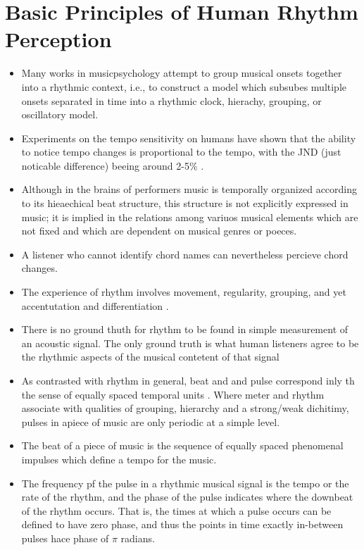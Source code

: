 \documentclass{scrartcl}
\begin{document}
\newpage
\section{Basic Principles of Human Rhythm Perception}

\begin{itemize}
\item Many works in musicpsychology attempt to group musical onsets together into a rhythmic context, i.e., to construct a model which subsubes multiple onsets separated in time into a rhythmic clock, hierachy, grouping, or oscillatory model.
\item Experiments on the tempo sensitivity on humans have shown that the ability to notice tempo changes is proportional to the tempo, with the JND (just noticable difference) beeing around 2-5\% \cite{Drake1993}.
\item Although in the brains of performers music is temporally organized according to its hieaechical beat structure, this structure is not explicitly expressed in music; it is implied in the relations among variuos musical elements which are not fixed and which are dependent on musical genres or poeces.
\item A listener who cannot identify chord names can nevertheless percieve chord changes.
\item The experience of rhythm involves movement, regularity, grouping, and yet accentutation and differentiation \cite{Handel1989}.
\item There is no ground thuth for rhythm to be found in simple measurement of an acoustic signal. The only ground truth is what human listeners agree to be the rhythmic aspects of the musical contetent of that signal
\item As contrasted with rhythm in general, beat and and pulse correspond inly th the sense of equally spaced temporal units \cite{Handel1989}. Where meter and rhythm associate with qualities of grouping, hierarchy and a strong/weak dichitimy, pulses in apiece of music are only periodic at a simple level.
\item The beat of a piece of music is the sequence of equally spaced phenomenal impulses which define a tempo for the music. 
\item The frequency pf the pulse in a rhythmic musical signal is the tempo or the rate of the rhythm, and the phase of the pulse indicates where the downbeat of the rhythm occurs. That is, the times at which a pulse occurs can be defined to have zero phase, and thus the points in time exactly in-between pulses hace phase of $\pi$ radians.

\end{itemize}
\end{document}
